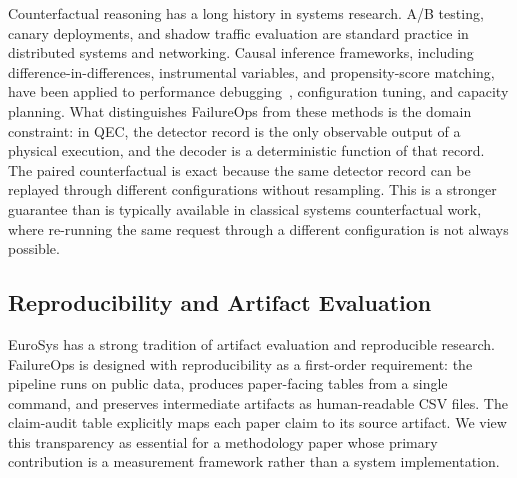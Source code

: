 Counterfactual reasoning has a long history in systems research. A/B testing, canary deployments, and shadow traffic evaluation are standard practice in distributed systems and networking. Causal inference frameworks, including difference-in-differences, instrumental variables, and propensity-score matching, have been applied to performance debugging~\cite{causal_perf}, configuration tuning, and capacity planning. What distinguishes FailureOps from these methods is the domain constraint: in QEC, the detector record is the only observable output of a physical execution, and the decoder is a deterministic function of that record. The paired counterfactual is exact because the same detector record can be replayed through different configurations without resampling. This is a stronger guarantee than is typically available in classical systems counterfactual work, where re-running the same request through a different configuration is not always possible.

\subsection{Reproducibility and Artifact Evaluation}

EuroSys has a strong tradition of artifact evaluation and reproducible research. FailureOps is designed with reproducibility as a first-order requirement: the pipeline runs on public data, produces paper-facing tables from a single command, and preserves intermediate artifacts as human-readable CSV files. The claim-audit table explicitly maps each paper claim to its source artifact. We view this transparency as essential for a methodology paper whose primary contribution is a measurement framework rather than a system implementation.
